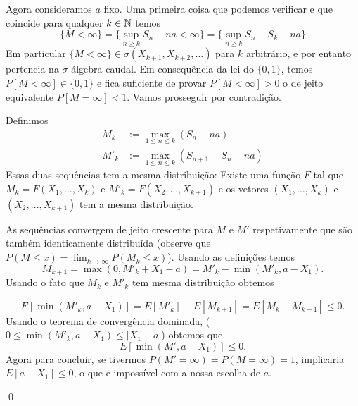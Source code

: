\medskip

Agora consideramos $a$ fixo.
Uma primeira coisa que podemos verificar e que coincide para qualquer $k\in {\ensuremath{\mathbb N}}$ temos
$$\{M<\infty\}=\{ \sup_{n\ge k} S_n-n a<\infty \}= \{\sup_{n\ge k} S_n-S_k-na \}$$
Em particular $\{M<\infty\}\in \sigma(X_{k+1},X_{k+2},\dots )$ para $k$ arbitrário, e por entanto pertencia na $\sigma$ álgebra caudal.
Em consequência da lei do $\{0,1\}$, temos $P[M<\infty]\in \{0,1\}$ e fica suficiente de provar $P[M<\infty]>0$ o de jeito equivalente
$P[M=\infty]<1$. Vamos prosseguir por contradição. 

\medskip

Definimos 
\begin{equation*}\begin{split}
                  M_k&:= \max_{1\le n \le k} (S_n-na)\\
                 M'_k&:= \max_{1\le n \le k} (S_{n+1}-S_n-na)
                 \end{split}
\end{equation*}
Essas duas sequências tem a mesma distribuição: Existe uma função $F$ tal que 
$M_k=F(X_1,\dots,X_k)$ e $M'_k=F(X_2,\dots,X_{k+1})$ e os vetores $(X_1,\dots,X_k)$ e $(X_2,\dots,X_{k+1})$ tem a mesma distribuição.

\medskip

As sequências convergem de jeito crescente para $M$ e $M'$ respetivamente que são também identicamente distribuída
(observe que $P(M\le x)=\lim_{k\to \infty} P(M_k\le x)$).
Usando as definições temos
\begin{equation*}
 M_{k+1}=\max(0,M'_k+X_1-a)=M'_k-\min(M'_k,a-X_1).
\end{equation*}
Usando o fato que $M_k$ e $M'_k$ tem mesma distribuição obtemos

$$E[\min(M'_k,a-X_1)]=E[M'_{k}]-E[M_{k+1}]=E[M_{k}-M_{k+1}]\le 0.$$
Usando o teorema de convergência dominada, ($0\le \min(M'_k,a-X_1)\le |X_1-a|$) obtemos que 
$$E[\min(M',a-X_1)]\le 0.$$
Agora para concluir, se tivermos $P(M'=\infty)=P(M=\infty)=1$, implicaria 
$E[a-X_1]\le 0$,
o que e impossível com a nossa escolha de $a$.

\qed






